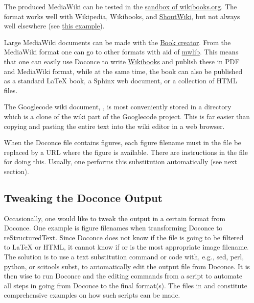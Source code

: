 \documentclass[%
oneside,                 %
final,                   %
chapterprefix=true,      %
open=right               %
10pt]{book}
\begin{document}
The produced MediaWiki can be tested in the \href{{http://en.wikibooks.org/wiki/Sandbox}}{sandbox of
wikibooks.org}. The format
works well with Wikipedia, Wikibooks, and
\href{{http://doconce.shoutwiki.com/wiki/Doconce_demo}}{ShoutWiki},
but not always well elsewhere
(see \href{{http://doconcedemo.jumpwiki.com/wiki/First_demo}}{this example}).

Large MediaWiki documents can be made with the
\href{{http://en.wikipedia.org/w/index.php?title=Special:Book&bookcmd=book_creator}}{Book creator}.
From the MediaWiki format one can go to other formats with aid
of \href{{http://pediapress.com/code/}}{mwlib}. This means that one can
easily use Doconce to write \href{{http://en.wikibooks.org}}{Wikibooks}
and publish these in PDF and MediaWiki format, while
at the same time, the book can also be published as a
standard {\LaTeX} book, a Sphinx web document, or a collection of HTML files.



The Googlecode wiki document, , is most conveniently stored
in a directory which is a clone of the wiki part of the Googlecode project.
This is far easier than copying and pasting the entire text into the
wiki editor in a web browser.

When the Doconce file contains figures, each figure filename must in
the  file be replaced by a URL where the figure is
available. There are instructions in the file for doing this. Usually,
one performs this substitution automatically (see next section).

\subsection{Tweaking the Doconce Output}

Occasionally, one would like to tweak the output in a certain format
from Doconce. One example is figure filenames when transforming
Doconce to reStructuredText. Since Doconce does not know if the
 file is going to be filtered to {\LaTeX} or HTML, it cannot know
if  or  is the most appropriate image filename.
The solution is to use a text substitution command or code with, e.g., sed,
perl, python, or scitools subst, to automatically edit the output file
from Doconce. It is then wise to run Doconce and the editing commands
from a script to automate all steps in going from Doconce to the final
format(s). The  files in  and 
constitute comprehensive examples on how such scripts can be made.
\end{document}
